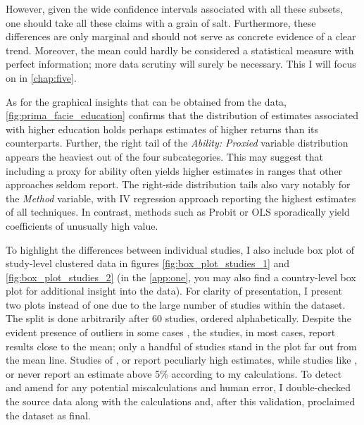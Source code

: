However, given the wide confidence intervals associated with all these subsets, one should take all these claims with a grain of salt. Furthermore, these differences are only marginal and should not serve as concrete evidence of a clear trend. Moreover, the mean could hardly be considered a statistical measure with perfect information; more data scrutiny will surely be necessary. This I will focus on in \autoref{chap:five}.

As for the graphical insights that can be obtained from the data, \autoref{fig:prima_facie_education} confirms that the distribution of estimates associated with higher education holds perhaps estimates of higher returns than its counterparts. Further, the right tail of the \textit{Ability: Proxied} variable distribution appears the heaviest out of the four subcategories. This may suggest that including a proxy for ability often yields higher estimates in ranges that other approaches seldom report. The right-side distribution tails also vary notably for the \textit{Method} variable, with \ac{IV} regression approach reporting the highest estimates of all techniques. In contrast, methods such as Probit or \ac{OLS} sporadically yield coefficients of unusually high value.

To highlight the differences between individual studies, I also include box plot of study-level clustered data in figures \ref{fig:box_plot_studies_1} and \ref{fig:box_plot_studies_2} (in the \autoref{app:one}, you may also find a country-level box plot for additional insight into the data). For clarity of presentation, I present two plots instead of one due to the large number of studies within the dataset. The split is done arbitrarily after 60 studies, ordered alphabetically. Despite the evident presence of outliers in some cases \citep{asadullah2006returns, harmon2002returns}, the studies, in most cases, report results close to the mean; only a handful of studies stand in the plot far out from the mean line. Studies of \cite{depken2019returns, girma2005heterogeneity}, or \cite{mphuka2012estimating} report peculiarly high estimates, while studies like \cite{angrist1995economic, li2007effect}, or \cite{webbink2004returns} never report an estimate above 5\% according to my calculations. To detect and amend for any potential miscalculations and human error, I double-checked the source data along with the calculations and, after this validation, proclaimed the dataset as final.

